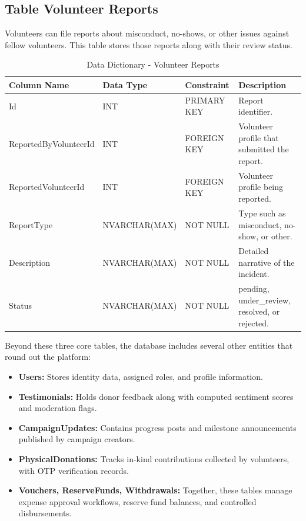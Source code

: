 \documentclass{thesis-library}
\begin{document}
\subsection{Table Volunteer Reports}
{\RaggedRight
Volunteers can file reports about misconduct, no-shows, or other issues against fellow volunteers. This table stores those reports along with their review status.\par}
\begin{table}[H]
    \centering
    \caption{Data Dictionary - Volunteer Reports}
    \vspace{10pt}
    \begin{tabularx}{\linewidth}{|l|l|l|L|}
        \hline
        \textbf{Column Name} & \textbf{Data Type} & \textbf{Constraint} & \textbf{Description} \\
        \hline
        Id & INT & PRIMARY KEY & Report identifier. \\
        \hline
        ReportedByVolunteerId & INT & FOREIGN KEY & Volunteer profile that submitted the report. \\
        \hline
        ReportedVolunteerId & INT & FOREIGN KEY & Volunteer profile being reported. \\
        \hline
        ReportType & NVARCHAR(MAX) & NOT NULL & Type such as misconduct, no-show, or other. \\
        \hline
        Description & NVARCHAR(MAX) & NOT NULL & Detailed narrative of the incident. \\
        \hline
        Status & NVARCHAR(MAX) & NOT NULL & pending, under\_review, resolved, or rejected. \\
        \hline
    \end{tabularx}
\end{table}

Beyond these three core tables, the database includes several other entities that round out the platform:
\begin{itemize}
    \item \textbf{Users:} Stores identity data, assigned roles, and profile information.
    \item \textbf{Testimonials:} Holds donor feedback along with computed sentiment scores and moderation flags.
    \item \textbf{CampaignUpdates:} Contains progress posts and milestone announcements published by campaign creators.
    \item \textbf{PhysicalDonations:} Tracks in-kind contributions collected by volunteers, with OTP verification records.
    \item \textbf{Vouchers, ReserveFunds, Withdrawals:} Together, these tables manage expense approval workflows, reserve fund balances, and controlled disbursements.
\end{itemize}
\end{document}
